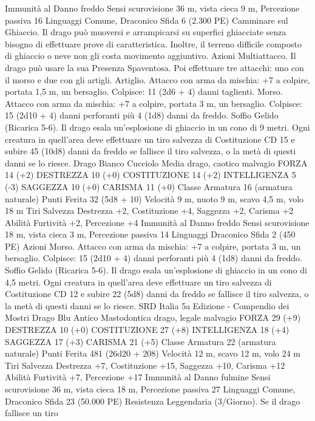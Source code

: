 \begin{multicols}{2}
Immunità al Danno freddo
Sensi scurovisione 36 m, vista cieca 9 m, Percezione passiva 16
Linguaggi Comune, Draconico
Sfida 6 (2.300 PE)
Camminare sul Ghiaccio. Il drago può muoversi e arrampicarsi su
superfici ghiacciate senza bisogno di effettuare prove di
caratteristica. Inoltre, il terreno difficile composto di ghiaccio o neve
non gli costa movimento aggiuntivo.
Azioni
Multiattacco. Il drago può usare la sua Presenza Spaventosa. Poi
effettuare tre attacchi: uno con il morso e due con gli artigli.
Artiglio. Attacco con arma da mischia: +7 a colpire, portata 1,5
m, un bersaglio.
Colpisce: 11 (2d6 + 4) danni taglienti.
Morso. Attacco con arma da mischia: +7 a colpire, portata 3 m,
un bersaglio.
Colpisce: 15 (2d10 + 4) danni perforanti più 4 (1d8) danni da freddo.
Soffio Gelido (Ricarica 5-6). Il drago esala un’esplosione di ghiaccio
in un cono di 9 metri. Ogni creatura in quell’area deve effettuare un tiro
salvezza di Costituzione CD 15 e subire 45 (10d8) danni da freddo se
fallisce il tiro salvezza, o la metà di questi danni se lo riesce.
Drago Bianco Cucciolo
Media drago, caotico malvagio
FORZA 14 (+2)
DESTREZZA 10 (+0)
COSTITUZIONE 14 (+2)
INTELLIGENZA 5 (-3)
SAGGEZZA 10 (+0)
CARISMA 11 (+0)
Classe Armatura 16 (armatura naturale)
Punti Ferita 32 (5d8 + 10)
Velocità 9 m, nuoto 9 m, scavo 4,5 m, volo 18 m
Tiri Salvezza Destrezza +2, Costituzione +4, Saggezza +2,
Carisma +2
Abilità Furtività +2, Percezione +4
Immunità al Danno freddo
Sensi scurovisione 18 m, vista cieca 3 m, Percezione passiva 14
Linguaggi Draconico
Sfida 2 (450 PE)
Azioni
Morso. Attacco con arma da mischia: +7 a colpire, portata 3 m,
un bersaglio.
Colpisce: 15 (2d10 + 4) danni perforanti più 4 (1d8) danni da freddo.
Soffio Gelido (Ricarica 5-6). Il drago esala un’esplosione di ghiaccio
in un cono di 4,5 metri. Ogni creatura in quell’area deve effettuare un
tiro salvezza di Costituzione CD 12 e subire 22 (5d8) danni da freddo
se fallisce il tiro salvezza, o la metà di questi danni se lo riesce.
SRD Italia 5a Edizione - Compendio dei Mostri
Drago Blu Antico
Mastodontica drago, legale malvagio
FORZA 29 (+9)
DESTREZZA 10 (+0)
COSTITUZIONE 27 (+8)
INTELLIGENZA 18 (+4)
SAGGEZZA 17 (+3)
CARISMA 21 (+5)
Classe Armatura 22 (armatura naturale)
Punti Ferita 481 (26d20 + 208)
Velocità 12 m, scavo 12 m, volo 24 m
Tiri Salvezza Destrezza +7, Costituzione +15, Saggezza +10,
Carisma +12
Abilità Furtività +7, Percezione +17
Immunità al Danno fulmine
Sensi scurovisione 36 m, vista cieca 18 m, Percezione passiva 27
Linguaggi Comune, Draconico
Sfida 23 (50.000 PE)
Resistenza Leggendaria (3/Giorno). Se il drago fallisce un tiro

\end{multicols}
